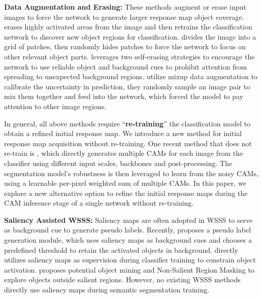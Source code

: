 \documentclass[10pt,twocolumn,letterpaper]{article}
\begin{document}
\noindent\textbf{Data Augmentation and Erasing:}
These methods augment or erase input images to force
the network to generate larger response map object coverage.
\cite{wei2017object}
erases highly activated areas from the image and then retrains the classification network to discover new object regions for classification. 
\cite{singh2017hide} divides the image into a grid of patches, then randomly hides patches to force the network to focus on other relevant object parts. 
\cite{hou2018self} leverages two self-erasing strategies to encourage the network to use reliable object and background cues to prohibit attention from spreading to unexpected background regions.
\cite{chang2020mixup, guo2019mixup} utilize mixup data augmentation to calibrate the uncertainty in prediction, they randomly sample an image pair to mix them together and feed into the network,
which forced the model to pay attention to other image regions.





In general, all above methods require \enquote{\textbf{re-training}} the classification model
to obtain a refined initial response map. We introduce a new method for initial response map acquisition without re-training.
One recent method that does not re-train is
\cite{fan2020employing}, which directly generates multiple CAMs for each image from the classifier using different input scales, backbones and post-processing. The segmentation model’s robustness is then leveraged to learn from the noisy CAMs, using a learnable per-pixel weighted sum of multiple CAMs.
In this paper, we explore a new alternative option
to refine the initial response maps during the CAM inference stage of a single network
without re-training.



\noindent\textbf{Saliency Assisted WSSS:}
Saliency maps are often adopted in WSSS
\cite{huang2018weakly, hou2018self, fan2020learning, fan2018cian, wei2018revisiting, jiang2019integral, lee2019ficklenet, sun2020mining, wang2018weakly, wei2017object} to serve as 
background cue to generate pseudo labels.
Recently, \cite{wu2021embedded} proposes a pseudo label generation module, which uses saliency maps as background cues and chooses a predefined threshold to retain the activated objects in background.  
\cite{lee2021railroad} directly utilizes saliency maps as supervision during classifier training to constrain object activation.
\cite{yao2021non} proposes potential object mining and Non-Salient Region Masking to explore objects outside salient regions.
However, no existing WSSS methods directly use saliency maps during semantic segmentation training.
\end{document}
